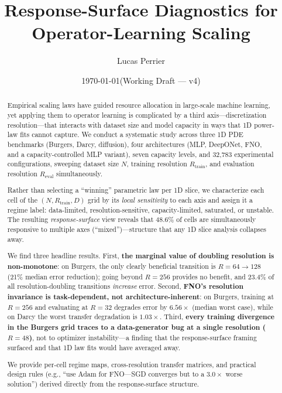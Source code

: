 \documentclass[11pt]{article}
\title{%
  Response-Surface Diagnostics for Operator-Learning Scaling%
}
\author{Lucas Perrier}
\date{\today \quad (Working Draft --- v4)}
\newcommand{\Reval}{R_{\mathrm{eval}}}
\newcommand{\Rtrain}{R_{\mathrm{train}}}
\newcommand{\totalRuns}{32{,}783}
\newcommand{\fnoWorstDeg}{6.56}
\newcommand{\darcyFnoWorstDeg}{1.03}
\newcommand{\sgdFnoRatio}{3.0}
\begin{document}
\maketitle

\begin{abstract}
Empirical scaling laws have guided resource allocation in large-scale
machine learning, yet applying them to operator learning is complicated
by a third axis---discretization resolution---that interacts with
dataset size and model capacity in ways that 1D power-law fits cannot
capture. We conduct a systematic study across three 1D PDE benchmarks
(Burgers, Darcy, diffusion), four architectures (MLP, DeepONet, FNO,
and a capacity-controlled MLP variant), seven capacity levels, and
\totalRuns{} experimental configurations, sweeping dataset size $N$,
training resolution $\Rtrain$, and evaluation resolution $\Reval$
simultaneously.

Rather than selecting a ``winning'' parametric law per 1D slice, we
characterize each cell of the $(N, \Rtrain, D)$ grid by its
\emph{local sensitivity} to each axis and assign it a regime label:
data-limited, resolution-sensitive, capacity-limited, saturated, or
unstable. The resulting \emph{response-surface} view reveals that
48.6\% of cells are simultaneously responsive to multiple axes
(``mixed'')---structure that any 1D slice analysis collapses away.

We find three headline results. First, \textbf{the marginal value of
doubling resolution is non-monotone}: on Burgers, the only clearly
beneficial transition is $R{=}64 \to 128$ (21\% median error
reduction); going beyond $R{=}256$ provides no benefit, and 23.4\%
of all resolution-doubling transitions \emph{increase} error.
Second, \textbf{FNO's resolution invariance is task-dependent,
not architecture-inherent}: on Burgers, training at $R{=}256$
and evaluating at $R{=}32$ degrades error by
$\fnoWorstDeg{\times}$ (median worst case), while on Darcy the
worst transfer degradation is $\darcyFnoWorstDeg{\times}$.
Third, \textbf{every training divergence in the Burgers grid traces
to a data-generator bug at a single resolution ($R{=}48$)}, not to
optimizer instability---a finding that the response-surface framing
surfaced and that 1D law fits would have averaged away.

We provide per-cell regime maps, cross-resolution transfer matrices,
and practical design rules (e.g., ``use Adam for FNO---SGD converges
but to a $\sgdFnoRatio{\times}$ worse solution'') derived directly
from the response-surface structure.
\end{abstract}
\end{document}
